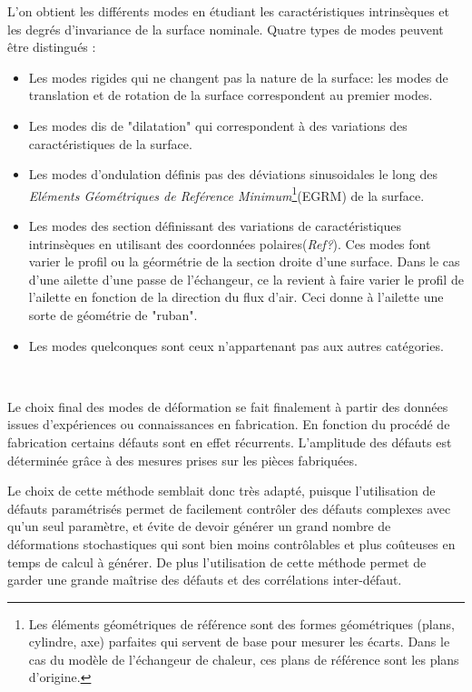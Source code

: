 \documentclass[a4paper,10pt]{article}
\begin{document}
L'on obtient les différents modes en étudiant les caractéristiques intrinsèques et les degrés d'invariance de la surface nominale. Quatre types de modes peuvent être distingués : 
\begin{itemize}
	\item Les modes rigides qui ne changent pas la nature de la surface: les modes de translation et de rotation de la surface correspondent au premier modes. 
	\item Les modes dis de "dilatation" qui correspondent à des variations des caractéristiques de la surface. 
	\item Les modes d'ondulation définis pas des déviations sinusoidales le long des \textit{Eléments Géométriques de Reférence Minimum}\footnote{Les éléments géométriques de référence sont des formes géométriques (plans, cylindre, axe) parfaites qui servent de base pour mesurer les écarts. Dans le cas du modèle de l'échangeur de chaleur, ces plans de référence sont les plans d'origine.}(EGRM) de la surface.  
	\item Les modes des section définissant des variations de caractéristiques intrinsèques en utilisant des coordonnées polaires(\textit{Ref?}). Ces modes font varier le profil ou la géormétrie de la section droite d'une surface. Dans le cas d'une ailette d'une passe de l'échangeur, ce la revient à faire varier le profil de l'ailette en fonction de la direction du flux d'air. Ceci donne à l'ailette une sorte de géométrie de "ruban". 
	\item Les modes quelconques sont ceux n'appartenant pas aux autres catégories. 
\end{itemize} \

Le choix final des modes de déformation se fait finalement à partir des données issues d’expériences ou connaissances en fabrication. En fonction du procédé de fabrication certains défauts sont en effet récurrents. L'amplitude des défauts est déterminée grâce à des mesures prises sur les pièces fabriquées. 
\linebreak

Le choix de cette méthode semblait donc très adapté, puisque l'utilisation de défauts paramétrisés permet de facilement contrôler des défauts complexes avec qu'un seul paramètre, et évite de devoir générer un grand nombre de déformations stochastiques qui sont bien moins contrôlables et plus coûteuses en temps de calcul à générer. 
De plus l'utilisation de cette méthode permet de garder une grande maîtrise des défauts et des corrélations inter-défaut.
\linebreak
\end{document}
